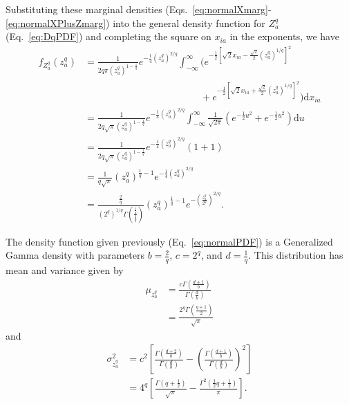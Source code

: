 \documentclass[aos]{imsart}
\begin{document}
Substituting these marginal densities (Eqs.~\ref{eq:normalXmarg}-\ref{eq:normalXPlusZmarg}) into the general density function for $Z^q_a$ (Eq.~\ref{eq:DqPDF}) and completing the square on $x_{ia}$ in the exponents, we have
%
\begin{equation}\label{eq:normalPDF}
\begin{aligned}
f_{Z^q_a}(z^q_a) &= \frac{1}{2 q \pi \left(z^q_a\right)^{1 - \frac{1}{q}}} e^{-\frac{1}{4}\left(z^q_a\right)^{2    /q}}\int_{-\infty}^{\infty} \biggl(e^{-\frac{1}{2}\left[\sqrt{2}x_{ia} - \frac{\sqrt{2}}{2}\left(z^q_a\right)^{1/q}\right]^2} \\
&\hspace{2in} + e^{-\frac{1}{2}\left[\sqrt{2}x_{ia} + \frac{\sqrt{2}}{2}\left(z^q_a\right)^{1/q}\right]^2}\biggr) \text{d}x_{ia} \\
&= \frac{1}{2 q \sqrt{\pi} \left(z^q_a\right)^{1 - \frac{1}{q}}} e^{-\frac{1}{4}\left(z^q_a\right)^{2/q}} \int_{-\infty}^{\infty}\frac{1}{\sqrt{2\pi}} \left(e^{-\frac{1}{2}u^2} + e^{-\frac{1}{2}u^2}\right) \text{d}u \\
&= \frac{1}{2 q \sqrt{\pi} \left(z^q_a\right)^{1 - \frac{1}{q}}} e^{-\frac{1}{4}\left(z^q_a\right)^{2/q}} (1 + 1) \\
&= \frac{1}{q \sqrt{\pi}}\left(z^q_a\right)^{\frac{1}{q} - 1} e^{-\frac{1}{4}\left(z^q_a\right)^{2/q}} \\
&= \frac{\frac{2}{q}}{\left(2^q\right)^{1/q} \Gamma\left(\frac{\frac{1}{q}}{\frac{2}{q}}\right)}\left(z^q_a\right)^{\frac{1}{q} - 1} e^{-\left(\frac{z^q_a}{2^q}\right)^{2/q}}.
\end{aligned}
\end{equation}

The density function given previously (Eq.~\ref{eq:normalPDF}) is a Generalized Gamma density with parameters $b = \frac{2}{q}$, $c = 2^q$, and $d = \frac{1}{q}$. This distribution has mean and variance given by
%
\begin{equation}\label{eq:1DnormalDqMean}
\begin{aligned}
\mu_{z^q_a} &= \frac{c\Gamma\left(\frac{d+1}{b}\right)}{\Gamma\left(\frac{d}{b}\right)} \\
&= \frac{2^q \Gamma\left(\frac{q + 1}{2}\right)}{\sqrt{\pi}}
\end{aligned}
\end{equation}
%
and
%
\begin{equation}\label{eq:1DnormalDqVar}
\begin{aligned}
\sigma^2_{z^q_a} &= c^2\left[\frac{\Gamma\left(\frac{d+2}{b}\right)}{\Gamma\left(\frac{d}{b}\right)} - \left(\frac{\Gamma\left(\frac{d+1}{b}\right)}{\Gamma\left(\frac{d}{b}\right)}\right)^2\right] \\
&= 4^{q}\left[\frac{\Gamma\left(q + \frac{1}{2}\right)}{\sqrt{\pi}} - \frac{\Gamma^2\left(\frac{1}{2}q + \frac{1}{2}\right)}{\pi}\right].
\end{aligned}
\end{equation}
\end{document}
